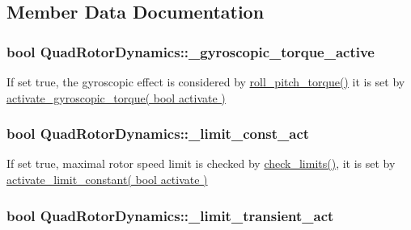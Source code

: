 \subsection{\-Member \-Data \-Documentation}
\hypertarget{classQuadRotorDynamics_a2f2eb8e9690abdc5679f0172e71b56fe}{
\subsubsection[{\-\_\-gyroscopic\-\_\-torque\-\_\-active}]{\setlength{\rightskip}{0pt plus 5cm}bool {\bf \-Quad\-Rotor\-Dynamics\-::\-\_\-gyroscopic\-\_\-torque\-\_\-active}}}\label{classQuadRotorDynamics_a2f2eb8e9690abdc5679f0172e71b56fe}
\-If set true, the gyroscopic effect is considered by \hyperlink{classQuadRotorDynamics_af7e8d034a94d648d9d6136e0540db630}{roll\-\_\-pitch\-\_\-torque()} it is set by \hyperlink{classQuadRotorDynamics_a8cbc221a76ea5bbbfa4e02749215d246}{activate\-\_\-gyroscopic\-\_\-torque( bool activate )} \hypertarget{classQuadRotorDynamics_a52129351aee2aa2ca2218c888f83fa8f}{
\subsubsection[{\-\_\-limit\-\_\-const\-\_\-act}]{\setlength{\rightskip}{0pt plus 5cm}bool {\bf \-Quad\-Rotor\-Dynamics\-::\-\_\-limit\-\_\-const\-\_\-act}}}\label{classQuadRotorDynamics_a52129351aee2aa2ca2218c888f83fa8f}
\-If set true, maximal rotor speed limit is checked by \hyperlink{classQuadRotorDynamics_a8c92658749a4850ff5926d580e418e7c}{check\-\_\-limits()}, it is set by \hyperlink{classQuadRotorDynamics_aa5e7a8721f17b3e893ffaf4ba2e11fe0}{activate\-\_\-limit\-\_\-constant( bool activate )} \hypertarget{classQuadRotorDynamics_a68be41ce31d096a587aabdc2c6f0bcfb}{
\subsubsection[{\-\_\-limit\-\_\-transient\-\_\-act}]{\setlength{\rightskip}{0pt plus 5cm}bool {\bf \-Quad\-Rotor\-Dynamics\-::\-\_\-limit\-\_\-transient\-\_\-act}}}\label{classQuadRotorDynamics_a68be41ce31d096a587aabdc2c6f0bcfb}
